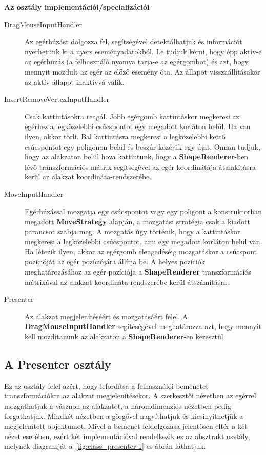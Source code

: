 \textbf{Az osztály implementációi/specializációi}

\begin{description}
	\item[DragMouseInputHandler] Az egérhúzást dolgozza fel, segítségével detektálhatjuk és információt nyerhetünk ki a nyers eseményadatokból. Le tudjuk kérni, hogy épp aktív-e az egérhúzás (a felhasználó nyomva tarja-e az egérgombot) és azt, hogy mennyit mozdult az egér az előző esemény óta. Az állapot visszaállításakor az aktív állapot inaktívvá válik.
	\item[InsertRemoveVertexInputHandler] Csak kattintásokra reagál. Jobb egérgomb kattintáskor megkeresi az egérhez a legközelebbi csúcspontot egy megadott korláton belül. Ha van ilyen, akkor törli. Bal kattintásra megkeresi a legközelebbi kettő csúcspontot egy poligonon belül és beszúr közéjük egy újat. Onnan tudjuk, hogy az alakzaton belül hova kattintunk, hogy a \textbf{ShapeRenderer}-ben lévő transzformációs mátrix segítségével az egér koordinátája átalakításra kerül az alakzat koordináta-rendszerébe.
	\item[MoveInputHandler] Egérhúzással mozgatja egy csúcspontot vagy egy poligont a konstruktorban megadott \textbf{MoveStrategy} alapján, a mozgatási stratégia csak a kiadott parancsot szabja meg. A mozgatás úgy történik, hogy a kattintáskor megkeresi a legközelebbi csúcspontot, ami egy megadott korláton belül van. Ha létezik ilyen, akkor az egérgomb elengedéséig mozgatáskor a csúcspont pozícióját az egér pozíciójára állítja be. A helyes pozíciók meghatározásához az egér pozíciója a \textbf{ShapeRenderer} transzformációs mátrixával az alakzat koordináta-rendszerébe kerül átszámításra.
	\item[Presenter] Az alakzat megjelenítéséért és mozgatásáért felel. A \textbf{DragMouseInputHandler} segítéségével meghatározza azt, hogy mennyit kell mozdítanunk az alakzaton a \textbf{ShapeRenderer}-en keresztül.
\end{description}

\subsection{A Presenter osztály}

Ez az osztály felel azért, hogy lefordítsa a felhasználói bemenetet transzformációkra az alakzat megjelenítésekor. A szerkesztői nézetben az egérrel mozgathatjuk a vásznon az alakzatot, a háromdimenziós nézetben pedig forgathatjuk. Mindkét nézetben a görgővel nagyíthatjuk és kicsinyíthetjük a megjelenített objektumot. Mivel a bemenet feldolgozása jelentősen eltér a két nézet esetében, ezért két implementációval rendelkezik ez az absztrakt osztály, melynek diagramját a~\ref{fig:class_presenter-1}-es ábrán láthatjuk.

